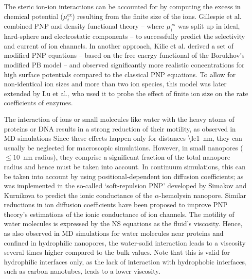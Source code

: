 \documentclass[journal=ancac3,manuscript=article,etalmode=truncate,maxauthors=0,layout=twocolumn]{achemso}
\begin{document}
The steric ion-ion interactions can be accounted for by computing the excess in chemical potential
($\mu_{i}^\text{ex}$) resulting from the finite size of the ions.\cite{Eisenberg-1996,Bazant-2009,
Daiguji-2010} Gillespie et al. combined PNP and density functional theory -- where $\mu_{i}^\text{ex}$ was
split up in ideal, hard-sphere and electrostatic components -- to successfully predict the selectivity and
current of ion channels.\cite{Gillespie-2002} In another approach, Kilic et al. derived a set of modified PNP
equations -- based on the free energy functional of the Borukhov's modified PB model\cite{Borukhov-1997} --
and observed significantly more realistic concentrations for high surface potentials compared to the classical
PNP equations.\cite{Kilic-2007} To allow for non-identical ion sizes and more than two ion species, this model
was later extended by Lu et al., who used it to probe the effect of finite ion size on the rate coefficients
of enzymes.\cite{Lu-2011}

The interaction of ions or small molecules like water with the heavy atoms of proteins or DNA results in a
strong reduction of their motility, as observed in MD simulations\cite{Makarov-1998,Pronk-2014} Since these
effects happen only for distances \SI{\le1}{\nm}, they can usually be neglected for macroscopic simulations.
However, in small nanopores ($\le10$~nm radius), they comprise a significant fraction of the total nanopore
radius and hence must be taken into account.\cite{Noskov-2004,Simakov-2010,Pederson-2015,McMullen-2017} In
continuum simulations, this can be taken into account by using positional-dependent ion diffusion
coefficients; as was implemented in the so-called `soft-repulsion PNP' developed by Simakov and
Kurnikova\cite{Simakov-2010, Simakov-2018} to predict the ionic conductance of the $\alpha$-hemolysin
nanopore. Similar reductions in ion diffusion coefficients have been proposed to improve PNP theory's
estimations of the ionic conductance of ion channels.\cite{Furini-2006,Liu-2015} The motility of water
molecules is expressed by the NS equations as the fluid's viscosity. Hence, as also observed in MD simulations
for water molecules near proteins\cite{Pronk-2014} and confined in hydrophilic
nanopores,\cite{Qiao_Aluru-2003,Vo-2016,Hsu-2017} the water-solid interaction leads to a viscosity several
times higher compared to the bulk values. Note that this is valid for hydrophilic interfaces only, as the lack
of interaction with hydrophobic interfaces, such as carbon nanotubes, leads to a lower
viscosity.\cite{Ye-2011}
\end{document}
